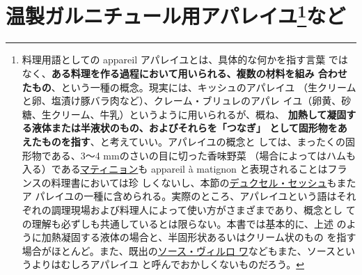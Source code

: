 \hypertarget{serie-des-appareiles-et-preparations-diverses-pour-garnitures-chaudes}{%
\section[温製ガルニチュール用アパレイユなど]{\texorpdfstring{温製ガルニチュール用アパレイユ\footnote{料理用語としての
  appareil アパレイユとは、具体的な何かを指す言葉
  ではなく、\textbf{ある料理を作る過程において用いられる、複数の材料を組み
  合わせたもの}、という一種の概念。現実には、キッシュのアパレイユ
  （生クリームと卵、塩漬け豚バラ肉など）、クレーム・ブリュレのアパレ
  イユ（卵黄、砂糖、生クリーム、牛乳）というように用いられるが、概ね、
  \textbf{加熱して凝固する液体または半液状のもの、およびそれらを「つなぎ」
  として固形物をあえたものを指す}、と考えていい。アパレイユの概念と
  しては、まったくの固形物である、3〜4 mmのさいの目に切った香味野菜
  （場合によってはハムも入る）である\protect\hyperlink{matignon}{マティニョン}も
  appareil à matignon と表現されることはフランスの料理書においては珍
  しくないし、本節の\protect\hyperlink{duxelles-seche}{デュクセル・セッシュ}もまたア
  パレイユの一種に含められる。実際のところ、アパレイユという語はそれ
  ぞれの調理現場および料理人によって使い方がさまざまであり、概念とし
  ての理解も必ずしも共通しているとは限らない。本書では基本的に、上述
  のように加熱凝固する液体の場合と、半固形状あるいはクリーム状のもの
  を指す場合がほとんど。また、既出の\protect\hyperlink{sauce-villeroy}{ソース・ヴィルロ
  ワ}などもまた、ソースというよりはむしろアパレイユ
  と呼んでおかしくないものだろう。}など}{温製ガルニチュール用アパレイユなど}}\label{serie-des-appareiles-et-preparations-diverses-pour-garnitures-chaudes}}


